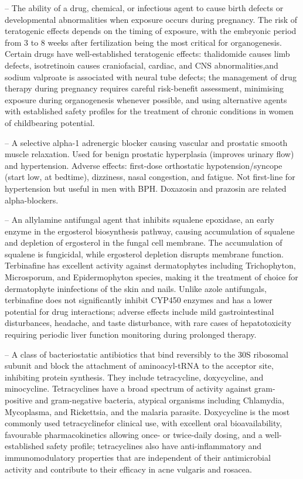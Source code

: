 -- The ability of a drug, chemical, or infectious agent to cause birth defects or developmental abnormalities when exposure occurs during pregnancy. The risk of teratogenic effects depends on the timing of exposure, with the embryonic period from 3 to 8 weeks after fertilization being the most critical for organogenesis. Certain drugs have well-established teratogenic effects: thalidomide causes limb defects, isotretinoin causes craniofacial, cardiac, and CNS abnormalities,and sodium valproate is associated with neural tube defects; the management of drug therapy during pregnancy requires careful risk-benefit assessment, minimising exposure during organogenesis whenever possible, and using alternative agents with established safety profiles for the treatment of chronic conditions in women of childbearing potential.

-- A selective alpha-1 adrenergic blocker causing vascular and prostatic smooth muscle relaxation. Used for benign prostatic hyperplasia (improves urinary flow) and hypertension. Adverse effects: first-dose orthostatic hypotension/syncope (start low, at bedtime), dizziness, nasal congestion, and fatigue. Not first-line for hypertension but useful in men with BPH. Doxazosin and prazosin are related alpha-blockers.

-- An allylamine antifungal agent that inhibits squalene epoxidase, an early enzyme in the ergosterol biosynthesis pathway, causing accumulation of squalene and depletion of ergosterol in the fungal cell membrane. The accumulation of squalene is fungicidal, while ergosterol depletion disrupts membrane function. Terbinafine has excellent activity against dermatophytes including Trichophyton, Microsporum, and Epidermophyton species, making it the treatment of choice for dermatophyte ininfections of the skin and nails. Unlike azole antifungals, terbinafine does not significantly inhibit CYP450 enzymes and has a lower potential for drug interactions; adverse effects include mild gastrointestinal disturbances, headache, and taste disturbance, with rare cases of hepatotoxicity requiring periodic liver function monitoring during prolonged therapy.

-- A class of bacteriostatic antibiotics that bind reversibly to the 30S ribosomal subunit and block the attachment of aminoacyl-tRNA to the acceptor site, inhibiting protein synthesis. They include tetracycline, doxycycline, and minocycline. Tetracyclines have a broad spectrum of activity against gram-positive and gram-negative bacteria, atypical organisms including Chlamydia, Mycoplasma, and Rickettsia, and the malaria parasite. Doxycycline is the most commonly used tetracyclinefor clinical use, with excellent oral bioavailability, favourable pharmacokinetics allowing once- or twice-daily dosing, and a well-established safety profile; tetracyclines also have anti-inflammatory and immunomodulatory properties that are independent of their antimicrobial activity and contribute to their efficacy in acne vulgaris and rosacea.

